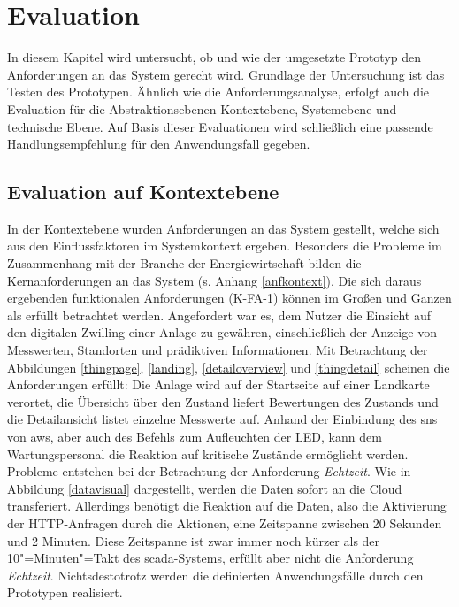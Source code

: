 \section{Evaluation}

In diesem Kapitel wird untersucht, ob und wie der umgesetzte Prototyp den Anforderungen an das System gerecht wird. Grundlage der Untersuchung ist das Testen des Prototypen. Ähnlich wie die Anforderungsanalyse, erfolgt auch die Evaluation für die Abstraktionsebenen Kontextebene, Systemebene und technische Ebene. Auf Basis dieser Evaluationen wird schließlich eine passende Handlungsempfehlung für den Anwendungsfall gegeben. 

\subsection{Evaluation auf Kontextebene}
In der Kontextebene wurden Anforderungen an das System gestellt, welche sich aus den Einflussfaktoren im Systemkontext ergeben. Besonders die Probleme im Zusammenhang mit der Branche der Energiewirtschaft bilden die Kernanforderungen an das System (s. Anhang \ref{anfkontext}). Die sich daraus ergebenden funktionalen Anforderungen (K-FA-1) können im Großen und Ganzen als erfüllt betrachtet werden. Angefordert war es, dem Nutzer die Einsicht auf den digitalen Zwilling einer Anlage zu gewähren, einschließlich der Anzeige von Messwerten, Standorten und prädiktiven Informationen. Mit Betrachtung der Abbildungen \ref{thingpage}, \ref{landing}, \ref{detailoverview} und \ref{thingdetail} scheinen die Anforderungen erfüllt: Die Anlage wird auf der Startseite auf einer Landkarte verortet, die Übersicht über den Zustand liefert Bewertungen des Zustands und die Detailansicht listet einzelne Messwerte auf. Anhand der Einbindung des \ac{sns} von \ac{aws}, aber auch des Befehls zum Aufleuchten der LED, kann dem Wartungspersonal die Reaktion auf kritische Zustände ermöglicht werden. Probleme entstehen bei der Betrachtung der Anforderung \textit{Echtzeit}. Wie in Abbildung \ref{datavisual} dargestellt, werden die Daten sofort an die Cloud transferiert. Allerdings benötigt die Reaktion auf die Daten, also die Aktivierung der HTTP-Anfragen durch die Aktionen, eine Zeitspanne zwischen 20 Sekunden und 2 Minuten. Diese Zeitspanne ist zwar immer noch kürzer als der 10"=Minuten"=Takt des \ac{scada}-Systems, erfüllt aber nicht die Anforderung \textit{Echtzeit}. Nichtsdestotrotz werden die definierten Anwendungsfälle durch den Prototypen realisiert. 

